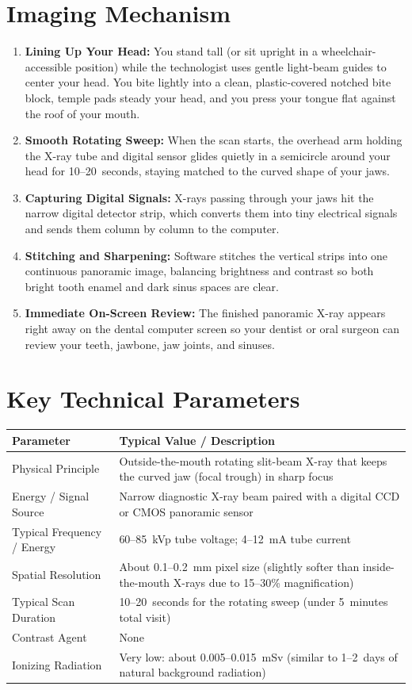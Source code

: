 \section{Imaging Mechanism}
\begin{enumerate}
\item \textbf{Lining Up Your Head:} You stand tall (or sit upright in a wheelchair-accessible position) while the technologist uses gentle light-beam guides to center your head. You bite lightly into a clean, plastic-covered notched bite block, temple pads steady your head, and you press your tongue flat against the roof of your mouth.
\item \textbf{Smooth Rotating Sweep:} When the scan starts, the overhead arm holding the X-ray tube and digital sensor glides quietly in a semicircle around your head for 10--20~seconds, staying matched to the curved shape of your jaws.
\item \textbf{Capturing Digital Signals:} X-rays passing through your jaws hit the narrow digital detector strip, which converts them into tiny electrical signals and sends them column by column to the computer.
\item \textbf{Stitching and Sharpening:} Software stitches the vertical strips into one continuous panoramic image, balancing brightness and contrast so both bright tooth enamel and dark sinus spaces are clear.
\item \textbf{Immediate On-Screen Review:} The finished panoramic X-ray appears right away on the dental computer screen so your dentist or oral surgeon can review your teeth, jawbone, jaw joints, and sinuses.
\end{enumerate}

\section{Key Technical Parameters}
\noindent
\begin{tabularx}{\textwidth}{@{}l X@{}}
\toprule
\textbf{Parameter} & \textbf{Typical Value / Description} \\
\midrule
Physical Principle & Outside-the-mouth rotating slit-beam X-ray that keeps the curved jaw (focal trough) in sharp focus \\
Energy / Signal Source & Narrow diagnostic X-ray beam paired with a digital CCD or CMOS panoramic sensor \\
Typical Frequency / Energy & 60--85~kVp tube voltage; 4--12~mA tube current \\
Spatial Resolution & About 0.1--0.2~mm pixel size (slightly softer than inside-the-mouth X-rays due to 15--30\% magnification) \\
Typical Scan Duration & 10--20~seconds for the rotating sweep (under 5~minutes total visit) \\
Contrast Agent & None \\
Ionizing Radiation & Very low: about 0.005--0.015~mSv (similar to 1--2~days of natural background radiation) \\
\bottomrule
\end{tabularx}

